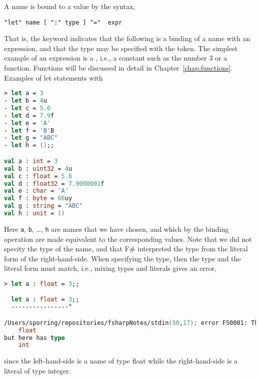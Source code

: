 A name is bound to a value by the syntax,
\begin{lstlisting}[language=ebnf]
  "let" name [ ":" type ] "="  expr
\end{lstlisting}
That is, the  keyword indicates that the following is a binding of a name with an expression, and that the type may be specified with the \idx{\token{:}} token. The simplest example of an expression is a , i.e., a constant such as the number 3 or a function. Functions will be discussed in detail in Chapter~\ref{chap:functions}. Examples of let statements with 
\begin{lstlisting}[language=fsharp,caption={fsharpi}]
> let a = 3 
- let b = 4u
- let c = 5.6
- let d = 7.9f
- let e = 'A'
- let f = 'B'B
- let g = "ABC"
- let h = ();;

val a : int = 3
val b : uint32 = 4u
val c : float = 5.6
val d : float32 = 7.9000001f
val e : char = 'A'
val f : byte = 66uy
val g : string = "ABC"
val h : unit = ()
\end{lstlisting}
Here \verb|a|, \verb|b|, \dots, \verb|h| are names that we have chosen, and which by the binding operation are made equivalent to the corresponding values. Note that we did not specity the type of the name, and that F\# interpreted the type from the literal form of the right-hand-side. When specifying the type, then the type and the literal form must match, i.e., mixing types and literals gives an error,
\begin{lstlisting}[language=fsharp,caption={fsharpi}]
> let a : float = 3;;

  let a : float = 3;;
  ----------------^

/Users/sporring/repositories/fsharpNotes/stdin(50,17): error FS0001: This expression was expected to have type
    float    
but here has type
    int    
\end{lstlisting}
since the left-hand-side is a name of type float while the right-hand-side is a literal of type integer.

